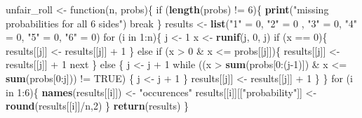 \documentclass[]{article}
\newenvironment{Shaded}{\begin{snugshade}}{\end{snugshade}}
\newcommand{\KeywordTok}[1]{\textcolor[rgb]{0.13,0.29,0.53}{\textbf{{#1}}}}
\newcommand{\DecValTok}[1]{\textcolor[rgb]{0.00,0.00,0.81}{{#1}}}
\newcommand{\StringTok}[1]{\textcolor[rgb]{0.31,0.60,0.02}{{#1}}}
\newcommand{\OtherTok}[1]{\textcolor[rgb]{0.56,0.35,0.01}{{#1}}}
\newcommand{\NormalTok}[1]{{#1}}
\begin{document}
\begin{Shaded}
\begin{Highlighting}[]
\NormalTok{unfair_roll <-}\StringTok{ }\NormalTok{function(n, probs)\{}
    \NormalTok{if (}\KeywordTok{length}\NormalTok{(probs) !=}\StringTok{ }\DecValTok{6}\NormalTok{)\{}
      \KeywordTok{print}\NormalTok{(}\StringTok{"missing probabilities for all 6 sides"}\NormalTok{)}
      \NormalTok{break}
    \NormalTok{\}}
    \NormalTok{results <-}\StringTok{ }\KeywordTok{list}\NormalTok{(}\StringTok{"1"} \NormalTok{=}\StringTok{ }\DecValTok{0}\NormalTok{, }\StringTok{"2"} \NormalTok{=}\StringTok{ }\DecValTok{0} \NormalTok{, }\StringTok{"3"} \NormalTok{=}\StringTok{ }\DecValTok{0}\NormalTok{, }\StringTok{"4"} \NormalTok{=}\StringTok{ }\DecValTok{0}\NormalTok{, }\StringTok{"5"} \NormalTok{=}\StringTok{ }\DecValTok{0}\NormalTok{, }\StringTok{"6"} \NormalTok{=}\StringTok{ }\DecValTok{0}\NormalTok{)}
         \NormalTok{for (i in }\DecValTok{1}\NormalTok{:n)\{}
       \NormalTok{j <-}\StringTok{ }\DecValTok{1} 
       \NormalTok{x <-}\StringTok{ }\KeywordTok{runif}\NormalTok{(j, }\DecValTok{0}\NormalTok{, j)}
       \NormalTok{if (x ==}\StringTok{ }\DecValTok{0}\NormalTok{)\{}
        \NormalTok{results[[j]] <-}\StringTok{ }\NormalTok{results[[j]] +}\StringTok{ }\DecValTok{1}
       \NormalTok{\} else if (x >}\StringTok{ }\DecValTok{0} \NormalTok{&}\StringTok{ }\NormalTok{x <=}\StringTok{ }\NormalTok{probs[[j]])\{}
        \NormalTok{results[[j]] <-}\StringTok{ }\NormalTok{results[[j]] +}\StringTok{ }\DecValTok{1}
        \NormalTok{next}
       \NormalTok{\} else \{}
       \NormalTok{j <-}\StringTok{ }\NormalTok{j +}\StringTok{ }\DecValTok{1}
       \NormalTok{while ((x >}\StringTok{ }\KeywordTok{sum}\NormalTok{(probs[}\DecValTok{0}\NormalTok{:(j}\DecValTok{-1}\NormalTok{)]) &}\StringTok{ }\NormalTok{x <=}\StringTok{ }\KeywordTok{sum}\NormalTok{(probs[}\DecValTok{0}\NormalTok{:j])) !=}\StringTok{ }\OtherTok{TRUE}\NormalTok{) \{}
       \NormalTok{j <-}\StringTok{ }\NormalTok{j +}\StringTok{ }\DecValTok{1}
       \NormalTok{\}}
       \NormalTok{results[[j]] <-}\StringTok{ }\NormalTok{results[[j]] +}\StringTok{ }\DecValTok{1}
       \NormalTok{\}}
     \NormalTok{\}}
    \NormalTok{for (i in }\DecValTok{1}\NormalTok{:}\DecValTok{6}\NormalTok{)\{}
     \KeywordTok{names}\NormalTok{(results[[i]]) <-}\StringTok{ "occurences"}
     \NormalTok{results[[i]][[}\StringTok{"probability"}\NormalTok{]] <-}\StringTok{ }\KeywordTok{round}\NormalTok{(results[[i]]/n,}\DecValTok{2}\NormalTok{)}
    \NormalTok{\}}
  \KeywordTok{return}\NormalTok{(results)}
\NormalTok{\}}
\end{Highlighting}
\end{Shaded}
\end{document}
